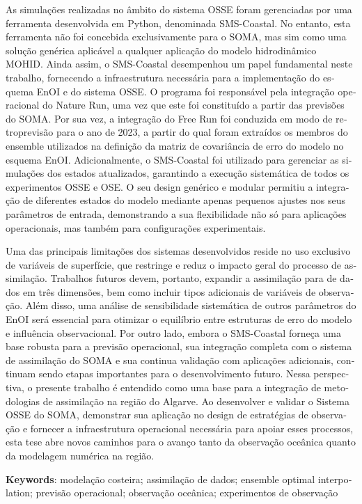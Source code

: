 \documentclass{auxfiles/ualgphdcls}
\begin{document}
\begin{otherlanguage}{portuguese}
As simulações realizadas no âmbito do sistema OSSE foram gerenciadas por uma ferramenta desenvolvida em Python, denominada SMS-Coastal. No entanto, esta ferramenta não foi concebida exclusivamente para o SOMA, mas sim como uma solução genérica aplicável a qualquer aplicação do modelo hidrodinâmico MOHID. Ainda assim, o SMS-Coastal desempenhou um papel fundamental neste trabalho, fornecendo a infraestrutura necessária para a implementação do esquema EnOI e do sistema OSSE. O programa foi responsável pela integração operacional do Nature Run, uma vez que este foi constituído a partir das previsões do SOMA. Por sua vez, a integração do Free Run foi conduzida em modo de retroprevisão para o ano de 2023, a partir do qual foram extraídos os membros do ensemble utilizados na definição da matriz de covariância de erro do modelo no esquema EnOI. Adicionalmente, o SMS-Coastal foi utilizado para gerenciar as simulações dos estados atualizados, garantindo a execução sistemática de todos os experimentos OSSE e OSE. O seu design genérico e modular permitiu a integração de diferentes estados do modelo mediante apenas pequenos ajustes nos seus parâmetros de entrada, demonstrando a sua flexibilidade não só para aplicações operacionais, mas também para configurações experimentais.

Uma das principais limitações dos sistemas desenvolvidos reside no uso exclusivo de variáveis de superfície, que restringe e reduz o impacto geral do processo de assimilação. Trabalhos futuros devem, portanto, expandir a assimilação para de dados em três dimensões, bem como incluir tipos adicionais de variáveis de observação. Além disso, uma análise de sensibilidade sistemática de outros parâmetros do EnOI será essencial para otimizar o equilíbrio entre estruturas de erro do modelo e influência observacional. Por outro lado, embora o SMS-Coastal forneça uma base robusta para a previsão operacional, sua integração completa com o sistema de assimilação do SOMA e sua continua validação com aplicações adicionais, continuam sendo etapas importantes para o desenvolvimento futuro. Nessa perspectiva, o presente trabalho é entendido como uma base para a integração de metodologias de assimilação na região do Algarve. Ao desenvolver e validar o Sistema OSSE do SOMA, demonstrar sua aplicação no design de estratégias de observação e fornecer a infraestrutura operacional necessária para apoiar esses processos, esta tese abre novos caminhos para o avanço tanto da observação oceânica quanto da modelagem numérica na região.

\vspace*{\fill}
\noindent\textbf{Keywords}: modelação costeira; assimilação de dados; ensemble optimal interpolation; previsão operacional; observação oceânica; experimentos de observação
\end{otherlanguage}
\newpage
\end{document}
